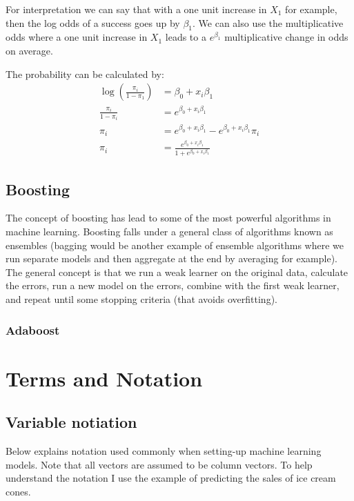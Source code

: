 \documentclass[paper=a4, fontsize=11pt]{scrartcl} %
\numberwithin{equation}{section} %
\numberwithin{figure}{section} %
\numberwithin{table}{section} %
\begin{document}
For interpretation we can say that with a one unit increase in $X_1$ for example, then the log odds of a success goes up by $\beta_1$. We can also use the multiplicative odds where a one unit increase in $X_1$ leads to a $e^{\beta_1}$ multiplicative change in odds on average.

The probability can be calculated by:
\begin{equation}
\begin{split}
\log \left(\frac{\pi_i}{1-\pi_1} \right) & = \beta_0 + x_i \beta_1 \\
\frac{\pi_i}{1-\pi_i} &= e^{\beta_0 + x_i \beta_1} \\
\pi_i &= e^{\beta_0 + x_i \beta_1} - e^{\beta_0 + x_i \beta_1} \pi_i \\
\pi_i &= \frac{e^{\beta_0 + x_i \beta_1}}{1+e^{\beta_0 + x_i \beta_1}}
\end{split}
\end{equation}


\subsection{Boosting}

The concept of boosting has lead to some of the most powerful algorithms in machine learning. Boosting falls under a general class of algorithms known as ensembles (bagging would be another example of ensemble algorithms where we run separate models and then aggregate at the end by averaging for example). The general concept is that we run a weak learner on the original data, calculate the errors, run a new model on the errors, combine with the first weak learner, and repeat until some stopping criteria (that avoids overfitting).

\subsubsection{Adaboost}


\section{Terms and Notation}

\subsection{Variable notiation}
\label{sec:notation}

Below explains notation used commonly when setting-up machine learning models. Note that all vectors are assumed to be column vectors. To help understand the notation I use the example of predicting the sales of ice cream cones. 
\vspace{2mm}
\end{document}

